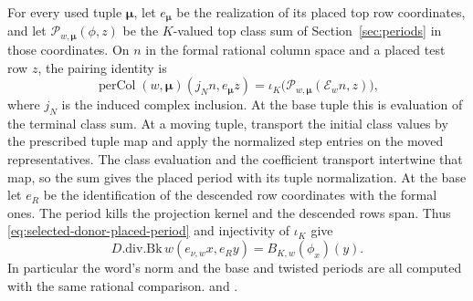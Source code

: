 For every used tuple \(\boldsymbol\mu\), let \(e_{\boldsymbol\mu}\)
be the realization of its placed top row coordinates, and let
\(\mathcal P_{w,\boldsymbol\mu}(\phi,z)\) be the \(K\)-valued
top class sum of Section~\ref{sec:periods} in those coordinates.
On \(n\) in the formal rational column space and a placed test
row \(z\), the pairing identity is
\begin{equation}
\label{eq:selected-donor-placed-period}
 \operatorname{perCol}(w,\boldsymbol\mu)
       (j_N n,e_{\boldsymbol\mu}z)
   =\iota_K\bigl(\mathcal P_{w,\boldsymbol\mu}(\mathcal E_w n,z)\bigr),
\end{equation}
where \(j_N\) is the induced complex inclusion. At the base
tuple this is evaluation of the terminal class sum. At a moving
tuple, transport the initial class values by the prescribed
tuple map and apply the normalized step entries on the moved
representatives. The class evaluation and the coefficient
transport intertwine that map, so the sum gives the placed period
with its tuple normalization. At the base let \(e_R\) be the
identification of the descended row coordinates with the formal
ones. The period kills the projection kernel and the descended
rows span. Thus \eqref{eq:selected-donor-placed-period} and
injectivity of \(\iota_K\) give
\begin{equation}
\label{eq:selected-donor-rational-period}
 D.\mathrm{div}.\mathrm{Bk}\,w(e_{\nu,w}x,e_R y)
     = B_{K,w}(\phi_x)(y).
\end{equation}
In particular the word's norm and the base and twisted periods
are all computed with the same rational comparison.
 and
.

